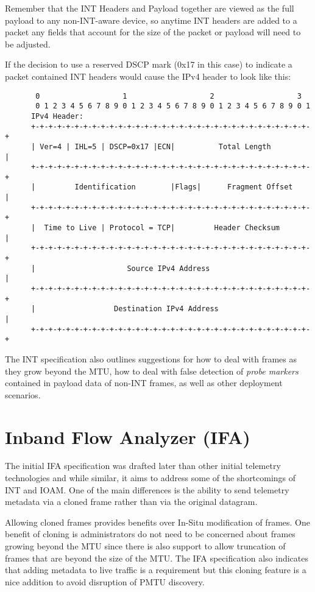 \documentclass[letterpaper,twocolumn,10pt]{article}
\begin{document}
Remember that the INT Headers and Payload together are viewed as the full
payload to any non-INT-aware device, so anytime INT headers are added to
a packet any fields that account for the size of the packet or
payload will need to be adjusted.

If the decision to use a reserved DSCP mark (0x17 in this case) to
indicate a packet contained INT headers would cause the IPv4 header to
look like this:

\tiny
\begin{center}
\begin{verbatim}
       0                   1                   2                   3
       0 1 2 3 4 5 6 7 8 9 0 1 2 3 4 5 6 7 8 9 0 1 2 3 4 5 6 7 8 9 0 1
      IPv4 Header:
      +-+-+-+-+-+-+-+-+-+-+-+-+-+-+-+-+-+-+-+-+-+-+-+-+-+-+-+-+-+-+-+-+
      | Ver=4 | IHL=5 | DSCP=0x17 |ECN|          Total Length         |
      +-+-+-+-+-+-+-+-+-+-+-+-+-+-+-+-+-+-+-+-+-+-+-+-+-+-+-+-+-+-+-+-+
      |         Identification        |Flags|      Fragment Offset    |
      +-+-+-+-+-+-+-+-+-+-+-+-+-+-+-+-+-+-+-+-+-+-+-+-+-+-+-+-+-+-+-+-+
      |  Time to Live | Protocol = TCP|         Header Checksum       |
      +-+-+-+-+-+-+-+-+-+-+-+-+-+-+-+-+-+-+-+-+-+-+-+-+-+-+-+-+-+-+-+-+
      |                     Source IPv4 Address                       |
      +-+-+-+-+-+-+-+-+-+-+-+-+-+-+-+-+-+-+-+-+-+-+-+-+-+-+-+-+-+-+-+-+
      |                  Destination IPv4 Address                     |
      +-+-+-+-+-+-+-+-+-+-+-+-+-+-+-+-+-+-+-+-+-+-+-+-+-+-+-+-+-+-+-+-+
\end{verbatim}
\end{center}
\normalsize

The INT specification also outlines suggestions for how to deal with
frames as they grow beyond the MTU, how to deal with false detection of
\textit{probe markers} contained in payload data of non-INT frames, as well as
other deployment scenarios.

\section{Inband Flow Analyzer (IFA)}

The initial IFA specification was drafted later than other initial
telemetry technologies and while similar, it aims to address some of the
shortcomings of INT and IOAM.  One of the main differences is the
ability to send telemetry metadata via a cloned frame rather than via
the original datagram.  

Allowing cloned frames provides benefits over In-Situ modification of
frames.  One benefit of cloning is administrators do not need to be
concerned about frames growing beyond the MTU since there is also
support to allow truncation of frames that are beyond the size of the
MTU.  The IFA specification also indicates that adding metadata to live
traffic is a requirement but this cloning feature is a nice addition to
avoid disruption of PMTU discovery.
\end{document}
